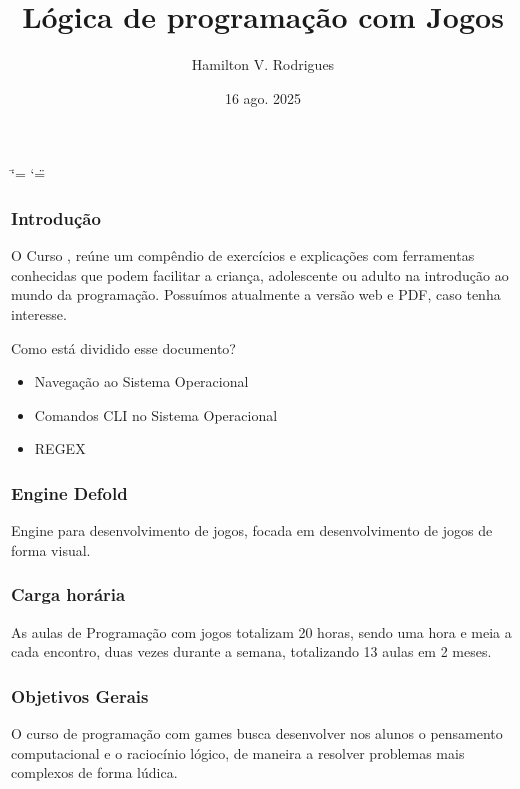 \documentclass[letterpaper,10pt,brazil]{sphinxmanual}
\title{Lógica de programação com Jogos}
\date{16 ago. 2025}
\author{Hamilton V.\@{} Rodrigues}
\begin{document}
\ifdefined\shorthandoff
  \ifnum\catcode`\=\string=\active\shorthandoff{=}\fi
  \ifnum\catcode`\"=\active{}\fi
\fi

\pagestyle{empty}
\sphinxmaketitle
\pagestyle{plain}
\sphinxtableofcontents
\pagestyle{normal}
\label{\detokenize{index::doc}}

\subsubsection*{Introdução}

\sphinxAtStartPar
O Curso , reúne um compêndio de exercícios e
explicações com ferramentas conhecidas que podem facilitar a criança, adolescente ou adulto na
introdução ao mundo da programação. Possuímos atualmente a versão web e PDF, caso tenha interesse.

\sphinxAtStartPar
Como está dividido esse documento?
\begin{itemize}
\item {} 
\sphinxAtStartPar
Navegação ao Sistema Operacional

\item {} 
\sphinxAtStartPar
Comandos CLI no Sistema Operacional

\item {} 
\sphinxAtStartPar
REGEX

\end{itemize}
\subsubsection*{Engine Defold}

\sphinxAtStartPar
Engine para desenvolvimento de jogos, focada em desenvolvimento de jogos de forma visual.
\subsubsection*{Carga horária}

\sphinxAtStartPar
As aulas de Programação com jogos totalizam 20 horas, sendo uma hora e meia a cada
encontro, duas vezes durante a semana, totalizando 13 aulas em 2 meses.
\subsubsection*{Objetivos Gerais}

\sphinxAtStartPar
O curso de programação com games busca desenvolver nos alunos o pensamento
computacional e o raciocínio lógico, de maneira a resolver problemas mais complexos de
forma lúdica.
\end{document}
